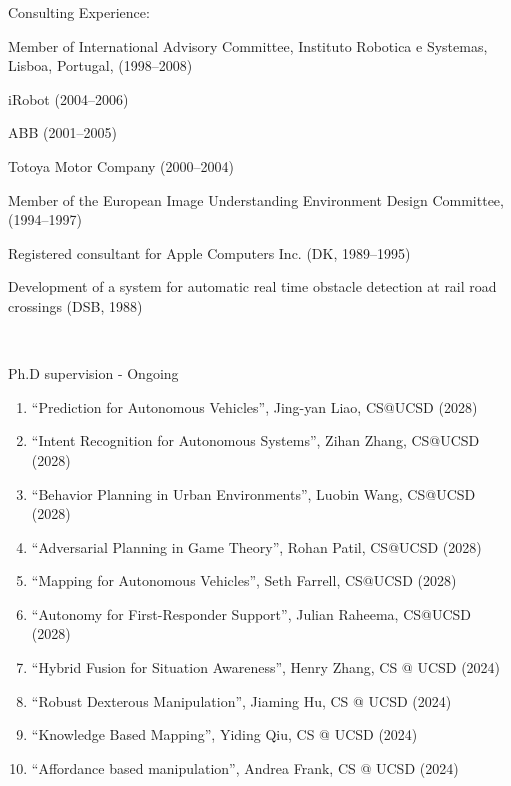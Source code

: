 \documentclass{article}
\newenvironment{sublist}{%
  \begin{list}{}{%
      \setlength{\itemsep}{0em}\setlength{\parsep}{0em}%
      \setlength{\topsep}{0em}\setlength{\parskip}{0em}%
    }%
}%
{ \end{list} }
\begin{document}
\begin{cv}
\begin{cvlist}{Consulting Experience:}
\begin{sublist}
  \item Member of International Advisory Committee, Instituto Robotica e
    Systemas, Lisboa, Portugal, (1998--2008)
  \item iRobot (2004--2006)
  \item ABB (2001--2005)
  \item Totoya Motor Company (2000--2004)
  \item Member of the European Image Understanding Environment Design
    Committee, (1994--1997)
  \item Registered consultant for Apple Computers Inc. (DK, 1989--1995)
  \item Development of a system for automatic real time obstacle
    detection at rail road crossings (DSB, 1988)
  \end{sublist}
\end{cvlist}



\begin{cvlist}{~}

\item[Ph.D supervision - Ongoing]\ \\
\begin{enumerate}
    \item ``Prediction for Autonomous Vehicles'', Jing-yan Liao, CS@UCSD (2028)
    \item ``Intent Recognition for Autonomous Systems'', Zihan Zhang, CS@UCSD (2028)
    \item ``Behavior Planning in Urban Environments'', Luobin Wang, CS@UCSD (2028)
    \item ``Adversarial Planning in Game Theory'', Rohan Patil, CS@UCSD (2028)
    \item ``Mapping for Autonomous Vehicles'', Seth Farrell, CS@UCSD (2028)
    \item ``Autonomy for First-Responder Support'', Julian Raheema, CS@UCSD (2028)
    \item ``Hybrid Fusion for Situation Awareness'', Henry Zhang, CS @  UCSD (2024)
    \item ``Robust Dexterous Manipulation'', Jiaming Hu, CS @ UCSD (2024)
    \item ``Knowledge Based Mapping'', Yiding Qiu, CS @ UCSD (2024)
    \item ``Affordance based manipulation'', Andrea Frank, CS @ UCSD (2024)
  \end{enumerate}


\end{cvlist}
\end{cv}
\end{document}
